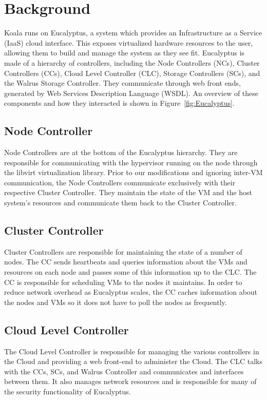\section{Background}
\label{sec:background}

Koala runs on Eucalyptus, a system which provides an Infrastructure as a
Service (IaaS) cloud interface.  This exposes virtualized hardware resources to
the user, allowing them to build and manage the system as they see fit.
Eucalyptus is made of a hierarchy of controllers, including the Node
Controllers (NCs), Cluster Controllers (CCs), Cloud Level Controller (CLC),
Storage Controllers (SCs), and the Walrus Storage Controller.  They communicate
through web front ends, generated by Web Services Description Language (WSDL).
An overview of these components and how they interacted is shown in
Figure~\ref{fig:Eucalyptus}.


\subsection{Node Controller}
Node Controllers are at the bottom of the Eucalyptus hierarchy.  They are responsible for communicating with the hypervisor running on the node through the libvirt virtualization library.  Prior to our modifications and ignoring inter-VM communication, the Node Controllers communicate exclusively with their respective Cluster Controller.  They maintain the state of the VM and the host system's resources and communicate them back to the Cluster Controller.

\subsection{Cluster Controller}
Cluster Controllers are responsible for maintaining the state of a number of nodes.  The CC sends heartbeats and queries information about the VMs and resources on each node and passes some of this information up to the CLC.  The CC is responsible for scheduling VMs to the nodes it maintains.  In order to reduce network overhead as Eucalyptus scales, the CC caches information about the nodes and VMs so it does not have to poll the nodes as frequently.

\subsection{Cloud Level Controller}
The Cloud Level Controller is responsible for managing the various controllers in the Cloud and providing a web front-end to administer the Cloud.  The CLC talks with the CCs, SCs, and Walrus Controller and communicates and interfaces between them.  It also manages network resources and is responsible for many of the security functionality of Eucalyptus.

